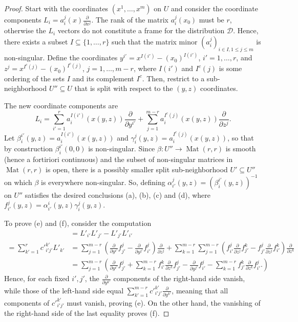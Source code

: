 \begin{proof}
Start with the coordinates $(x^1,\ldots,x^m)$ on $U$ and consider the coordinate
components $L_i = a_i^j(x) \frac{\partial}{\partial x^j}$. The rank of the
matrix $a_i^j(x_0)$ must be $r$, otherwise the $L_i$ vectors do not constitute a
frame for the distribution $\mathcal{D}$. Hence, there exists a subset $I
\subseteq \{1,\ldots,r\}$ such that the matrix minor $(a_i^j)_{i\in I, 1\le j\le
m}$ is non-singular. Define the coordinates $y^{i'} = x^{I(i')} -
(x_0)^{I(i')}$, $i'=1,\ldots,r$, and $z^{j} = x^{I^c(j)} - (x_0)^{I^c(j)}$,
$j=1,\ldots,m-r$, where $I(i')$ and $I^c(j)$ is some ordering of the sets $I$
and its complement $I^c$. Then, restrict to a sub-neighborhood $U'' \subseteq U$
that is split with respect to the $(y,z)$ coordinates.

The new coordinate components are
\[
  L_{i} = \sum_{i'=1}^r a_{i}^{I(i')}(x(y,z)) \frac{\partial}{\partial y^{i'}}
    + \sum_{j=1}^{m-r} a_{i}^{I^c(j)}(x(y,z)) \frac{\partial}{\partial z^j} .
\]
Let $\beta_{i}^{i'}(y,z) = a_{i}^{I(i')}(x(y,z))$ and $\gamma_{i}^{j}(y,z) =
a_{i}^{I^c(j)}(x(y,z))$, so that by construction $\beta_{i}^{i'}(0,0)$ is
non-singular. Since $\beta \colon U'' \to \operatorname{Mat}(r,r)$ is smooth
(hence a fortiriori continuous) and the subset of non-singular matrices in
$\operatorname{Mat}(r,r)$ is open, there is a possibly smaller split
sub-neighborhood $U' \subseteq U''$ on which $\beta$ is everywhere non-singular.
So, defining $\alpha_{i'}^j(y,z) = (\beta_{i}^{i'}(y,z))^{-1}$ on $U''$
satisfies the desired conclusions (a), (b), (c) and (d), where $f_{i'}^j(y,z) =
\alpha_{i'}^i(y,z) \gamma_{i}^j(y,z)$.

To prove (e) and (f), consider the computation
\begin{align*}
  [L'_{i'}, L'_{j'}]
  &= L'_{i'} L'_{j'} - L'_{j'} L'_{i'}
  \\
  = \sum_{k'=1}^r c'^{k'}_{i'j'} L'_{k'}
  &= \sum_{j=1}^{m-r} \left(\frac{\partial}{\partial y^{i'}} f_{j'}^j - \frac{\partial}{\partial y^{j'}} f_{i'}^j\right)\frac{\partial}{\partial z^j}
    + \sum_{k=1}^{m-r} \sum_{j=1}^{m-r} \left(f_{i'}^j \frac{\partial}{\partial z^j} f_{j'}^k - f_{j'}^j \frac{\partial}{\partial z^j} f_{i'}^k\right) \frac{\partial}{\partial z^k}
  \\
  &= \sum_{j=1}^{m-r} \left(
    \frac{\partial}{\partial y^{i'}} f_{j'}^j
    + \sum_{k=1}^{m-r} f_{i'}^k \frac{\partial}{\partial z^k} f_{j'}^j
    - \frac{\partial}{\partial y^{j'}} f_{i'}^j
    - \sum_{k=1}^{m-r} f_{j'}^k \frac{\partial}{\partial z^k} f_{i'}^j .
  \right)
\end{align*}
Hence, for each fixed $i',j'$, the $\frac{\partial}{\partial y^{k'}}$ components
of the right-hand side vanish, while those of the left-hand side equal
$\sum_{k'=1}^{m-r} c'^{k'}_{i'j'} \frac{\partial}{\partial y^{k'}}$, meaning
that all components of $c'^{k'}_{i'j'}$ must vanish, proving (e). On the other hand, the vanishing of the right-hand side of the last equality proves (f).
\end{proof}

